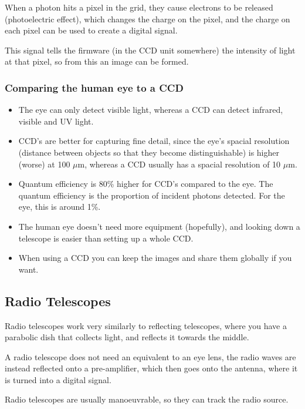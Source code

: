 \documentclass[a4paper, 12pt]{article}
\begin{document}
When a photon hits a pixel in the grid, they cause electrons to be released (photoelectric effect), which changes the charge on the pixel, and the charge on each pixel can be used to create a digital signal.

This signal tells the firmware (in the CCD unit somewhere) the intensity of light at that pixel, so from this an image can be formed.

\subsubsection{Comparing the human eye to a CCD}

\begin{itemize}
	\item The eye can only detect visible light, whereas a CCD can detect infrared, visible and UV light.

	\item CCD's are better for capturing fine detail, since the eye's spacial resolution (distance between objects so that they become distinguishable) is higher (worse) at 100 $\mu$m, whereas a CCD usually has a spacial resolution of 10 $\mu$m.

	\item Quantum efficiency is 80\% higher for CCD's compared to the eye. The quantum efficiency is the proportion of incident photons detected. For the eye, this is around 1\%.

	\item The human eye doesn't need more equipment (hopefully), and looking down a telescope is easier than setting up a whole CCD.

	\item When using a CCD you can keep the images and share them globally if you want.
\end{itemize}


\subsection{Radio Telescopes}

Radio telescopes work very similarly to reflecting telescopes, where you have a parabolic dish that collects light, and reflects it towards the middle.

A radio telescope does not need an equivalent to an eye lens, the radio waves are instead reflected onto a pre-amplifier, which then goes onto the antenna, where it is turned into a digital signal.

Radio telescopes are usually manoeuvrable, so they can track the radio source.
\end{document}
